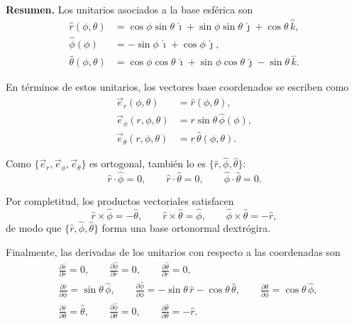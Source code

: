 \documentclass[../apunte_mecanica_clasica.tex]{subfiles}%
\begin{document}
\begin{apuntebloque}{}

\textbf{Resumen.} Los unitarios asociados a la base esférica son
\begin{equation*}
\begin{aligned}
  \hat{r}(\phi,\theta) &= \cos\phi\sin\theta\,\hat{\imath} + \sin\phi\sin\theta\,\hat{\jmath} + \cos\theta\,\hat{k},\\
  \hat{\phi}(\phi)     &= -\sin\phi\,\hat{\imath} + \cos\phi\,\hat{\jmath},\\
  \hat{\theta}(\phi,\theta) &= \cos\phi\cos\theta\,\hat{\imath} + \sin\phi\cos\theta\,\hat{\jmath} - \sin\theta\,\hat{k}.
\end{aligned}
\end{equation*}

En términos de estos unitarios, los vectores base coordenados se escriben como
\begin{equation*}
\begin{aligned}
  \vec{e}_r(\phi,\theta) &= \hat{r}(\phi,\theta),\\
  \vec{e}_\phi(r,\phi,\theta) &= r\sin\theta\,\hat{\phi}(\phi),\\
  \vec{e}_\theta(r,\phi,\theta) &= r\,\hat{\theta}(\phi,\theta).
\end{aligned}
\end{equation*}

Como $\{\vec{e}_r,\vec{e}_\phi,\vec{e}_\theta\}$ es ortogonal, también lo es $\{\hat{r},\hat{\phi},\hat{\theta}\}$:
\begin{equation*}
  \hat{r}\cdot\hat{\phi}=0,\qquad
  \hat{r}\cdot\hat{\theta}=0,\qquad
  \hat{\phi}\cdot\hat{\theta}=0.
\end{equation*}

Por completitud, los productos vectoriales satisfacen
\begin{equation*}
  \hat{r}\times\hat{\phi}=-\hat{\theta},\qquad
  \hat{r}\times\hat{\theta}=\hat{\phi},\qquad
  \hat{\phi}\times\hat{\theta}=-\hat{r},
\end{equation*}
de modo que $\{\hat{r},\hat{\phi},\hat{\theta}\}$ forma una base ortonormal dextrógira.

Finalmente, las derivadas de los unitarios con respecto a las coordenadas son
\begin{equation*}
\begin{aligned}
  &\frac{\partial \hat{r}}{\partial r}=0,\qquad
    \frac{\partial \hat{\phi}}{\partial r}=0,\qquad
    \frac{\partial \hat{\theta}}{\partial r}=0,\\[4pt]
  &\frac{\partial \hat{r}}{\partial \phi}=\sin\theta\,\hat{\phi},\qquad
    \frac{\partial \hat{\phi}}{\partial \phi}=-\sin\theta\,\hat{r}-\cos\theta\,\hat{\theta},\qquad
    \frac{\partial \hat{\theta}}{\partial \phi}=\cos\theta\,\hat{\phi},\\[4pt]
  &\frac{\partial \hat{r}}{\partial \theta}=\hat{\theta},\qquad
    \frac{\partial \hat{\phi}}{\partial \theta}=0,\qquad
    \frac{\partial \hat{\theta}}{\partial \theta}=-\hat{r}.
\end{aligned}
\end{equation*}
\end{apuntebloque}
\end{document}
